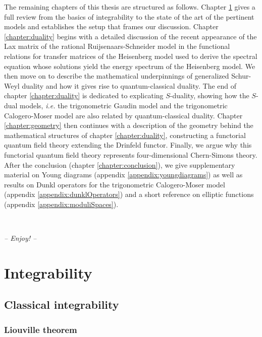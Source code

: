 \documentclass[11pt]{report}
\theoremstyle{definition}
\theoremstyle{remark}
\theoremstyle{remark}
\begin{document}
The remaining chapters of this thesis are structured as follows. Chapter \ref{chapter:integrability} gives a full review from the basics of integrability to the state of the art of the pertinent models and establishes the setup that frames our discussion. Chapter \ref{chapter:duality} begins with a detailed discussion of the recent appearance of the Lax matrix of the rational Ruijsenaars-Schneider model in the functional relations for transfer matrices of the Heisenberg model used to derive the spectral equation whose solutions yield the energy spectrum of the Heisenberg model. We then move on to describe the mathematical underpinnings of generalized Schur-Weyl duality and how it gives rise to quantum-classical duality. The end of chapter \ref{chapter:duality} is dedicated to explicating $S$-duality, showing how the $S$-dual models, \emph{i.e.} the trigonometric Gaudin model and the trigonometric Calogero-Moser model are also related by quantum-classical duality. Chapter \ref{chapter:geometry} then continues with a description of the geometry behind the mathematical structures of chapter \ref{chapter:duality}, constructing a functorial quantum field theory extending the Drinfeld functor. Finally, we argue why this functorial quantum field theory represents four-dimensional Chern-Simons theory. After the conclusion (chapter \ref{chapter:conclusion}), we give supplementary material on Young diagrams (appendix \ref{appendix:youngdiagrams}) as well as results on Dunkl operators for the trigonometric Calogero-Moser model (appendix \ref{appendix:dunklOperators}) and a short reference on elliptic functions (appendix \ref{appendix:moduliSpaces}).

~\\

\begin{center}
{\Large \textit{-- Enjoy! --}}
\end{center}


\chapter{Integrability}\label{chapter:integrability}

\section{Classical integrability}

\subsection{Liouville theorem}
\end{document}
